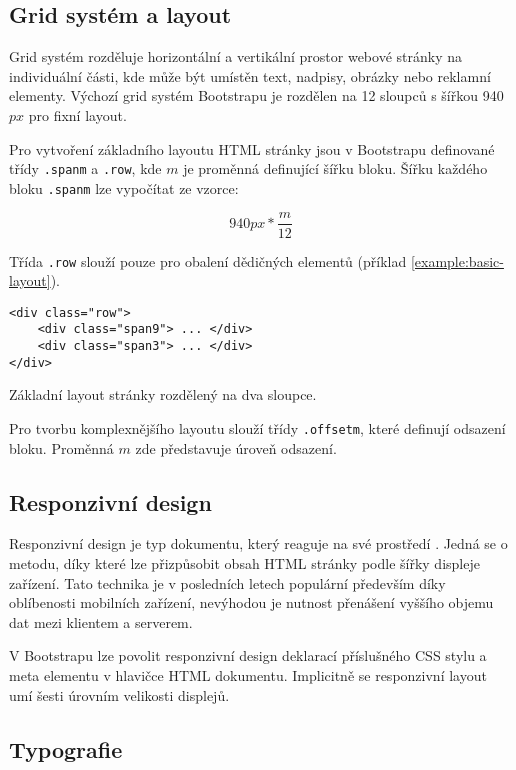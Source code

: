 \subsection{Grid systém a layout}

Grid systém rozděluje horizontální a vertikální prostor webové stránky na individuální části, kde může být umístěn text, nadpisy, obrázky nebo reklamní elementy. Výchozí grid systém Bootstrapu je rozdělen na 12 sloupců s šířkou 940$px$ pro fixní layout.

Pro vytvoření základního layoutu HTML stránky jsou v Bootstrapu definované třídy \texttt{.spanm} a \texttt{.row}, kde $m$ je proměnná definující šířku bloku. Šířku každého bloku \texttt{.spanm} lze vypočítat ze vzorce:

$$940px * \frac{m}{12}$$

Třída \texttt{.row} slouží pouze pro obalení dědičných elementů (příklad \ref{example:basic-layout}).

\begin{example}
    \centering
    \begin{lstlisting}
<div class="row">
    <div class="span9"> ... </div>
    <div class="span3"> ... </div>
</div>
    \end{lstlisting}
    \caption{Základní layout stránky rozdělený na dva sloupce.}
    \label{example:basic-layout}
\end{example}

Pro tvorbu komplexnějšího layoutu slouží třídy \texttt{.offsetm}, které definují odsazení bloku. Proměnná $m$ zde představuje úroveň odsazení.

\subsection{Responzivní design}

Responzivní design je typ dokumentu, který reaguje na své prostředí \cite{responsive-design}. Jedná se o metodu, díky které lze přizpůsobit obsah HTML stránky podle šířky displeje zařízení. Tato technika je v posledních letech populární především díky oblíbenosti mobilních zařízení, nevýhodou je nutnost přenášení vyššího objemu dat mezi klientem a serverem.

V Bootstrapu lze povolit responzivní design deklarací příslušného CSS stylu a meta elementu v hlavičce HTML dokumentu. Implicitně se responzivní layout umí  šesti úrovním velikosti displejů.

\subsection{Typografie}

